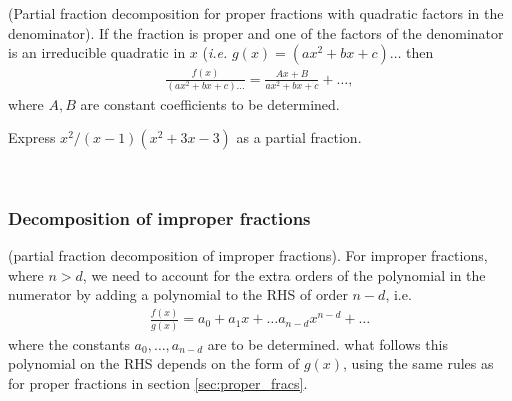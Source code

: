 \begin{definition}
    (Partial fraction decomposition for proper fractions with quadratic factors in the denominator). If the fraction is proper and one of the factors of the denominator is an irreducible quadratic in $x$ (\textit{i.e.} $g(x) = (ax^2+bx+c)\ldots$ then
    \begin{align}
        \label{quadratic_pf} \frac{f(x)}{(ax^2+bx+c)\ldots} = \frac{Ax+B}{ax^2+bx+c} + \ldots,
    \end{align}
    where $A,B$ are constant coefficients to be determined. 
\end{definition}

\begin{example}
    Express $x^2/(x-1)(x^2+3x-3)$ as a partial fraction.
\end{example}
\\

\subsubsection{Decomposition of improper fractions}

\begin{definition}
\label{def:improper}
    (partial fraction decomposition of improper fractions). For improper fractions, where $n > d$, we need to account for the extra orders of the polynomial in the numerator by adding a polynomial to the RHS of order $n-d$, i.e.
    \begin{align}
        \label{improper} \frac{f(x)}{g(x)} = a_0 + a_1x + \ldots a_{n-d} x^{n-d} + \ldots
    \end{align}
    where the constants $a_0, \ldots, a_{n-d}$ are to be determined. what follows this polynomial on the RHS depends on the form of $g(x)$, using the same rules as for proper fractions in section \ref{sec:proper_fracs}.
\end{definition}

